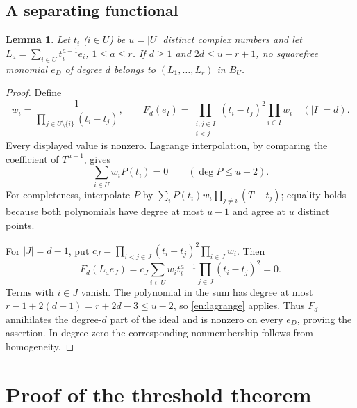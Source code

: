 \documentclass[12pt]{amsart}
\newtheorem{lem}[thm]{Lemma}
\theoremstyle{definition}
\theoremstyle{remark}
\numberwithin{equation}{section}
\begin{document}
\subsection{A separating functional}
\begin{lem}\label{en:interpolation}
Let $t_i$ ($i\in U$) be $u=|U|$ distinct complex numbers and let
$L_a=\sum_{i\in U}t_i^{a-1}e_i$, $1\leq a\leq r$. If $d\geq1$ and
$2d\leq u-r+1$, no squarefree monomial $e_D$ of degree $d$ belongs to
$(L_1,\ldots,L_r)$ in $B_U$.
\end{lem}
\begin{proof}
Define
\begin{equation}\label{en:functional}
 w_i=\frac1{\prod_{j\in U\setminus\{i\}}(t_i-t_j)},\qquad
 F_d(e_I)=
 \prod_{\substack{i,j\in I\\i<j}}(t_i-t_j)^2\prod_{i\in I}w_i
 \quad(|I|=d).
\end{equation}
Every displayed value is nonzero. Lagrange interpolation, by comparing
the coefficient of $T^{u-1}$, gives
\begin{equation}\label{en:lagrange}
 \sum_{i\in U}w_i P(t_i)=0\qquad(\deg P\leq u-2).
\end{equation}
For completeness, interpolate $P$ by
$\sum_i P(t_i)w_i\prod_{j\ne i}(T-t_j)$; equality holds because both
polynomials have degree at most $u-1$ and agree at $u$ distinct points.

For $|J|=d-1$, put
$c_J=\prod_{i<j\in J}(t_i-t_j)^2\prod_{i\in J}w_i$. Then
\begin{equation}\label{en:annihilation}
 F_d(L_a e_J)=c_J\sum_{i\in U}w_i t_i^{a-1}
                         \prod_{j\in J}(t_i-t_j)^2=0.
\end{equation}
Terms with $i\in J$ vanish. The polynomial in the sum has degree at most
$r-1+2(d-1)=r+2d-3\leq u-2$, so \eqref{en:lagrange} applies.
Thus $F_d$ annihilates the degree-$d$ part of the ideal and is nonzero on
every $e_D$, proving the assertion. In degree zero the corresponding
nonmembership follows from homogeneity.
\end{proof}

\section{Proof of the threshold theorem}
\end{document}
